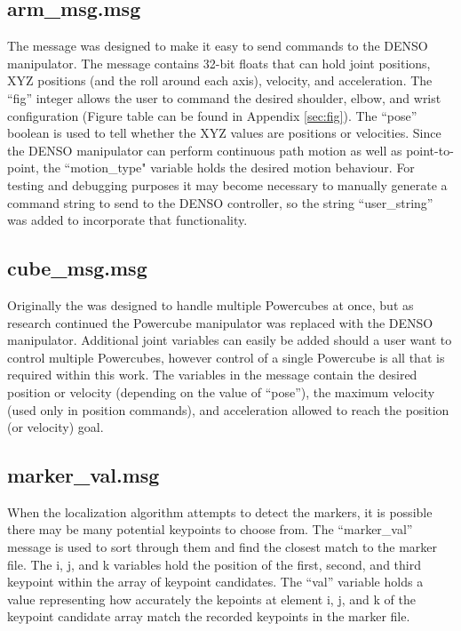 \subsection{arm\_msg.msg}
The  message was designed to make it easy to send commands to the DENSO manipulator. The message contains 32-bit floats that can hold joint positions, XYZ positions (and the roll around each axis), velocity, and acceleration. The ``fig'' integer allows the user to command the desired shoulder, elbow, and wrist configuration (Figure table can be found in Appendix \ref{sec:fig}). The ``pose'' boolean is used to tell  whether the XYZ values are positions or velocities. Since the DENSO manipulator can perform continuous path motion as well as point-to-point, the ``motion\_type" variable holds the desired motion behaviour. For testing and debugging purposes it may become necessary to manually generate a command string to send to the DENSO controller, so the string ``user\_string'' was added to incorporate that functionality.\\

\subsection{cube\_msg.msg}
Originally the  was designed to handle multiple Powercubes at once, but as research continued the Powercube manipulator was replaced with the DENSO manipulator. Additional joint variables can easily be added should a user want to control multiple Powercubes, however control of a single Powercube is all that is required within this work. The variables in the  message contain the desired position or velocity (depending on the value of ``pose''), the maximum velocity (used only in position commands), and acceleration allowed to reach the position (or velocity) goal.\\

\subsection{marker\_val.msg}
When the localization algorithm attempts to detect the markers, it is possible there may be many potential keypoints to choose from. The ``marker\_val'' message is used to sort through them and find the closest match to the marker file. The i, j, and k variables hold the position of the first, second, and third keypoint within the array of keypoint candidates. The ``val'' variable holds a value representing how accurately the kepoints at element i, j, and k of the keypoint candidate array match the recorded keypoints in the marker file.\\


